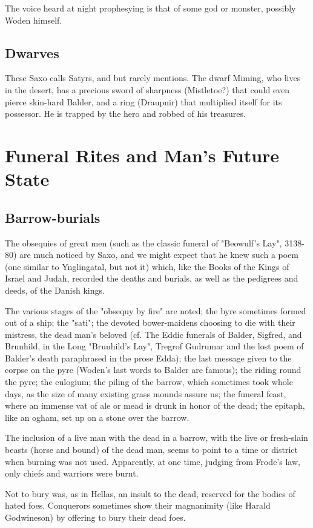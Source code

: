 \documentclass[10pt,a4paper]{report}
\begin{document}
The voice heard at night prophesying is that of some god or monster, possibly Woden himself.

\section{Dwarves}
These Saxo calls Satyrs, and but rarely mentions. The dwarf Miming, who lives in the desert, has a precious sword of sharpness (Mistletoe?) that could even pierce skin-hard Balder, and a ring (Draupnir) that multiplied itself for its possessor. He is trapped by the hero and robbed of his treasures.


\chapter{Funeral Rites and Man's Future State}
\section{Barrow-burials}
The obsequies of great men (such as the classic funeral of "Beowulf's Lay", 3138-80) are much noticed by Saxo, and we might expect that he knew such a poem (one similar to Ynglingatal, but not it) which, like the Books of the Kings of Israel and Judah, recorded the deaths and burials, as well as the pedigrees and deeds, of the Danish kings.

The various stages of the "obsequy by fire" are noted; the byre sometimes formed out of a ship; the "sati"; the devoted bower-maidens choosing to die with their mistress, the dead man's beloved (cf. The Eddic funerals of Balder, Sigfred, and Brunhild, in the Long "Brunhild's Lay", Tregrof Gudrumar and the lost poem of Balder's death paraphrased in the prose Edda); the last message given to the corpse on the pyre (Woden's last words to Balder are famous); the riding round the pyre; the eulogium; the piling of the barrow, which sometimes took whole days, as the size of many existing grass mounds assure us; the funeral feast, where an immense vat of ale or mead is drunk in honor of the dead; the epitaph, like an ogham, set up on a stone over the barrow.

The inclusion of a live man with the dead in a barrow, with the live or fresh-slain beasts (horse and bound) of the dead man, seems to point to a time or district when burning was not used. Apparently, at one time, judging from Frode's law, only chiefs and warriors were burnt.

Not to bury was, as in Hellas, an insult to the dead, reserved for the bodies of hated foes. Conquerors sometimes show their magnanimity (like Harald Godwineson) by offering to bury their dead foes.
\end{document}
